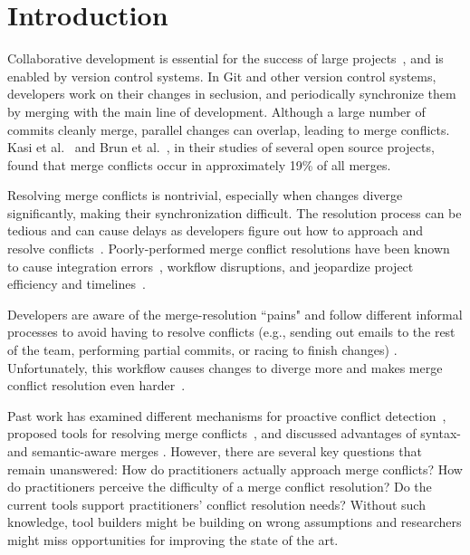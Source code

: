 

\section{Introduction}\label{introduction}

Collaborative development is essential for the success of large projects~\cite{hattori2010syde}, and is enabled by version control systems. 
In Git and other version control systems, developers work on their changes in seclusion, and periodically synchronize them by merging with the main line of development. 
Although a large number of commits cleanly merge, parallel changes can overlap, leading to merge conflicts. Kasi et al.~\cite{cassandra} and Brun et al.~\cite{Brun2011}, in their studies of several open source projects, found that merge conflicts occur in approximately 19\% of all merges.

Resolving merge conflicts is nontrivial, especially when changes diverge significantly, making their synchronization difficult. 
The resolution process can be tedious and can cause delays as developers figure out how to approach and resolve conflicts~\cite{cassandra}. 
Poorly-performed merge conflict resolutions have been known to cause integration errors~\cite{bird-branches-conflict}, workflow disruptions, and jeopardize project efficiency and timelines~\cite{estler2014awareness}. 

Developers are aware of the merge-resolution ``pains" and follow different informal processes to avoid having to resolve conflicts (e.g., sending out emails to the rest of the team, performing partial commits, or racing to finish changes) \cite{deSouza2003breaking}\cite{cataldo2008distributed_dev}.
Unfortunately, this workflow causes changes to diverge more and makes merge conflict resolution even harder~\cite{Brun2011}. 

Past work has examined different mechanisms for proactive conflict detection~\cite{Brun2011}\cite{palantir}\cite{Guimaraes}, proposed tools for resolving merge conflicts~\cite{nishimura}\cite{mens2002state}, and discussed advantages of syntax- and semantic-aware merges \cite{danny_refactorings}\cite{hunt2002extensible}. 
However, there are several key questions that remain unanswered: How do practitioners actually approach merge conflicts? How do practitioners perceive the difficulty of a merge conflict resolution? Do the current tools support practitioners' conflict resolution needs?
Without such knowledge, tool builders might be building on wrong assumptions and researchers might miss opportunities for improving the state of the art.


